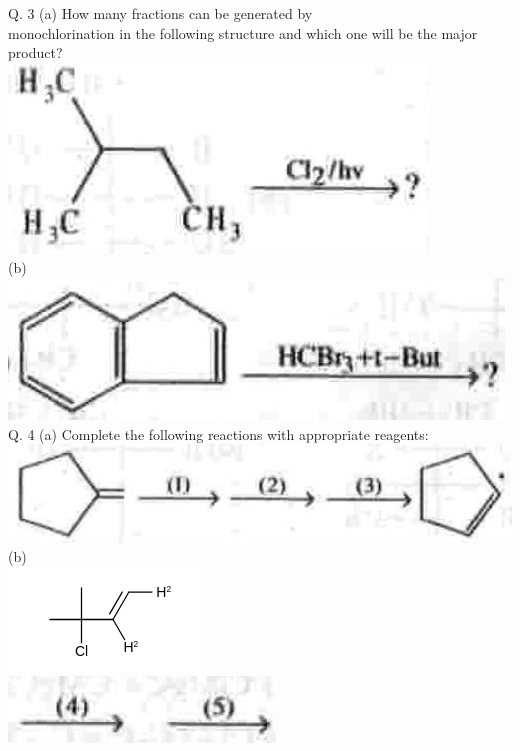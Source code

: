 \documentclass[10pt]{article}
\begin{document}
Q. 3 (a) How many fractions can be generated by\\
monochlorination in the following structure and which one will be the major product?\\
\includegraphics[max width=\textwidth, center]{2025_01_28_8470952b98110cec3aabg-238(8)}\\
(b)\\
\includegraphics[max width=\textwidth, center]{2025_01_28_8470952b98110cec3aabg-238(1)}\\
Q. 4 (a) Complete the following reactions with appropriate reagents:\\
\includegraphics[max width=\textwidth, center]{2025_01_28_8470952b98110cec3aabg-238(5)}\\
(b)\\
\includegraphics{smile-a0d16e6cc50f5153f6f6e310866f8c7e1b28d520}\\
\includegraphics[max width=\textwidth, center]{2025_01_28_8470952b98110cec3aabg-238(6)}\\
\end{document}
